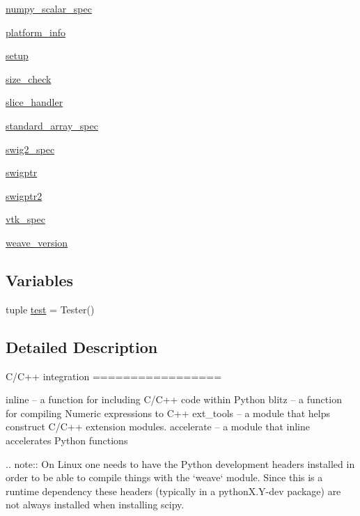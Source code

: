 \begin{DoxyCompactItemize}
 \hyperlink{namespacescipy_1_1weave_1_1numpy__scalar__spec}{numpy\+\_\+scalar\+\_\+spec}
\item 
 \hyperlink{namespacescipy_1_1weave_1_1platform__info}{platform\+\_\+info}
\item 
 \hyperlink{namespacescipy_1_1weave_1_1setup}{setup}
\item 
 \hyperlink{namespacescipy_1_1weave_1_1size__check}{size\+\_\+check}
\item 
 \hyperlink{namespacescipy_1_1weave_1_1slice__handler}{slice\+\_\+handler}
\item 
 \hyperlink{namespacescipy_1_1weave_1_1standard__array__spec}{standard\+\_\+array\+\_\+spec}
\item 
 \hyperlink{namespacescipy_1_1weave_1_1swig2__spec}{swig2\+\_\+spec}
\item 
 \hyperlink{namespacescipy_1_1weave_1_1swigptr}{swigptr}
\item 
 \hyperlink{namespacescipy_1_1weave_1_1swigptr2}{swigptr2}
\item 
 \hyperlink{namespacescipy_1_1weave_1_1vtk__spec}{vtk\+\_\+spec}
\item 
 \hyperlink{namespacescipy_1_1weave_1_1weave__version}{weave\+\_\+version}
\end{DoxyCompactItemize}
\subsection*{Variables}
\begin{DoxyCompactItemize}
\item 
tuple \hyperlink{namespacescipy_1_1weave_a904d48ea68578c1d6a80c0fd080d04df}{test} = Tester()
\end{DoxyCompactItemize}


\subsection{Detailed Description}
\begin{DoxyVerb}C/C++ integration
=================

    inline     -- a function for including C/C++ code within Python
    blitz      -- a function for compiling Numeric expressions to C++
    ext_tools  -- a module that helps construct C/C++ extension modules.
    accelerate -- a module that inline accelerates Python functions


.. note:: On Linux one needs to have the Python development headers installed
      in order to be able to compile things with the `weave` module.
      Since this is a runtime dependency these headers (typically in a
      pythonX.Y-dev package) are not always installed when installing
      scipy.\end{DoxyVerb}
 

